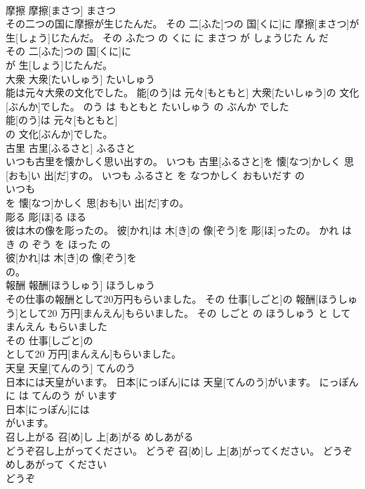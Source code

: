 \documentclass[8pt]{extreport}
\begin{document}
\begin{CJK}{UTF8}{min}
\\	摩擦	摩擦[まさつ]	まさつ	
\\	その二つの国に摩擦が生じたんだ。	その 二[ふた]つの 国[くに]に 摩擦[まさつ]が 生[しょう]じたんだ。	その ふたつ の くに に まさつ が しょうじた ん だ	
\\	その 二[ふた]つの 国[くに]に
\\	が 生[しょう]じたんだ。			
\\	大衆	大衆[たいしゅう]	たいしゅう	
\\	能は元々大衆の文化でした。	能[のう]は 元々[もともと] 大衆[たいしゅう]の 文化[ぶんか]でした。	のう は もともと たいしゅう の ぶんか でした	
\\	能[のう]は 元々[もともと]
\\	の 文化[ぶんか]でした。			
\\	古里	古里[ふるさと]	ふるさと	
\\	いつも古里を懐かしく思い出すの。	いつも 古里[ふるさと]を 懐[なつ]かしく 思[おも]い 出[だ]すの。	いつも ふるさと を なつかしく おもいだす の	
\\	いつも
\\	を 懐[なつ]かしく 思[おも]い 出[だ]すの。			
\\	彫る	彫[ほ]る	ほる	
\\	彼は木の像を彫ったの。	彼[かれ]は 木[き]の 像[ぞう]を 彫[ほ]ったの。	かれ は き の ぞう を ほった の	
\\	彼[かれ]は 木[き]の 像[ぞう]を
\\	の。			
\\	報酬	報酬[ほうしゅう]	ほうしゅう	
\\	その仕事の報酬として20万円もらいました。	その 仕事[しごと]の 報酬[ほうしゅう]として20 万円[まんえん]もらいました。	その しごと の ほうしゅう と して 
\\	まんえん もらいました	
\\	その 仕事[しごと]の
\\	として20 万円[まんえん]もらいました。			
\\	天皇	天皇[てんのう]	てんのう	
\\	日本には天皇がいます。	日本[にっぽん]には 天皇[てんのう]がいます。	にっぽん に は てんのう が います	
\\	日本[にっぽん]には
\\	がいます。			
\\	召し上がる	召[め]し 上[あ]がる	めしあがる	
\\	どうぞ召し上がってください。	どうぞ 召[め]し 上[あ]がってください。	どうぞ めしあがって ください	
\\	どうぞ

\end{CJK}
\end{document}
